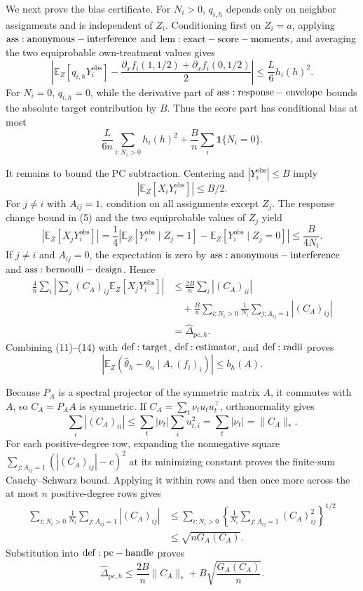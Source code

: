 We next prove the bias certificate.  For \(N_i>0\), \(q_{i,h}\) depends only on neighbor assignments and is independent of \(Z_i\).  Conditioning first on \(Z_i=a\), applying \({\rm ass:anonymous-interference}\) and \({\rm lem:exact-score-moments}\), and averaging the two equiprobable own-treatment values gives
\[
 \left|\mathbb E_Z[q_{i,h}Y_i^{\mathrm{obs}}]
 -\frac{\partial_xf_i(1,1/2)+\partial_xf_i(0,1/2)}2\right|
 \leq\frac L6h_i(h)^2.
\tag{10}
\]
For \(N_i=0\), \(q_{i,h}=0\), while the derivative part of \({\rm ass:response-envelope}\) bounds the absolute target contribution by \(B\).  Thus the score part has conditional bias at most
\[
 \frac{L}{6n}\sum_{i:N_i>0}h_i(h)^2
 +\frac Bn\sum_i\mathbf1\{N_i=0\}.
\tag{11}
\]

It remains to bound the PC subtraction.  Centering and \(|Y_i^{\mathrm{obs}}|\leq B\) imply
\[
 |\mathbb E_Z[X_iY_i^{\mathrm{obs}}]|\leq B/2.
\tag{12}
\]
For \(j\ne i\) with \(A_{ij}=1\), condition on all assignments except \(Z_j\).  The response change bound in (5) and the two equiprobable values of \(Z_j\) yield
\[
 |\mathbb E_Z[X_jY_i^{\mathrm{obs}}]|
 =\frac14\left|\mathbb E_Z[Y_i^{\mathrm{obs}}\mid Z_j=1]
 -\mathbb E_Z[Y_i^{\mathrm{obs}}\mid Z_j=0]\right|
 \leq\frac B{4N_i}.
\tag{13}
\]
If \(j\ne i\) and \(A_{ij}=0\), the expectation is zero by \({\rm ass:anonymous-interference}\) and \({\rm ass:bernoulli-design}\).  Hence
\[
\begin{aligned}
 \frac4n\sum_i\left|\sum_j(C_A)_{ij}\mathbb E_Z[X_jY_i^{\mathrm{obs}}]\right|
 &\leq\frac{2B}{n}\sum_i|(C_A)_{ii}|\\
 &\quad+\frac Bn\sum_{i:N_i>0}\frac1{N_i}
       \sum_{j:A_{ij}=1}|(C_A)_{ij}|\\
 &=\widehat\Delta_{\mathrm{pc},h}.
\end{aligned}
\tag{14}
\]
Combining (11)--(14) with \({\rm def:target}\), \({\rm def:estimator}\), and \({\rm def:radii}\) proves
\[
 \left|\mathbb E_Z(\widehat\theta_h-\theta_n\mid A,(f_i)_i)\right|
 \leq\overline b_h(A).
\tag{15}
\]

Because \(P_A\) is a spectral projector of the symmetric matrix \(A\), it commutes with \(A\), so \(C_A=P_AA\) is symmetric.  If \(C_A=\sum_t\nu_tu_tu_t^\top\), orthonormality gives
\[
 \sum_i|(C_A)_{ii}|
 \leq\sum_t|\nu_t|\sum_i u_{t,i}^2
 =\sum_t|\nu_t|=\|C_A\|_*.
\tag{16}
\]
For each positive-degree row, expanding the nonnegative square
\(\sum_{j:A_{ij}=1}(|(C_A)_{ij}|-c)^2\) at its minimizing constant proves the finite-sum Cauchy--Schwarz bound.  Applying it within rows and then once more across the at most \(n\) positive-degree rows gives
\[
\begin{aligned}
 \sum_{i:N_i>0}\frac1{N_i}\sum_{j:A_{ij}=1}|(C_A)_{ij}|
 &\leq\sum_{i:N_i>0}
 \left\{\frac1{N_i}\sum_{j:A_{ij}=1}(C_A)_{ij}^2\right\}^{1/2}\\
 &\leq\sqrt{nG_A(C_A)}.
\end{aligned}
\tag{17}
\]
Substitution into \({\rm def:pc-handle}\) proves
\[
 \widehat\Delta_{\mathrm{pc},h}
 \leq\frac{2B}{n}\|C_A\|_*+B\sqrt{\frac{G_A(C_A)}n}.
\tag{18}
\]

